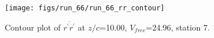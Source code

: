\begin{figure}[H]
\centering
\texttt{[image: figs/run\_66/run\_66\_rr\_contour]}
\caption{Contour plot of $\overline{r^\prime r^\prime}$ at $z/c$=10.00, $V_{free}$=24.96, station 7.}
\end{figure}


